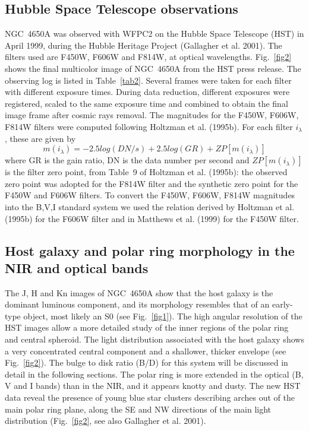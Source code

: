 \documentclass[preprint]{aastex}
\begin{document}
\subsection{Hubble Space Telescope observations}\label{HSTobs}
NGC~4650A was observed with WFPC2 on the Hubble Space Telescope (HST) 
in April 1999, during the Hubble Heritage Project 
(Gallagher et al. 2001).
The filters used are F450W, F606W and F814W, at 
optical wavelengths.
Fig.~\ref{fig2} shows the final multicolor image of NGC~4650A from the 
HST press release.
The observing log is listed in Table~\ref{tab2}.
Several frames were taken for each filter with different exposure times.
During data reduction, different exposures were registered,
scaled to the same exposure time and combined to obtain the final image frame
after cosmic rays removal. 
The magnitudes for the F450W, F606W, F814W filters were computed
following Holtzman et al. (1995b). 
For each filter $i_{\lambda}$, these are given by
\begin{equation}
m(i_{\lambda})=-2.5log(DN/s)+2.5log(GR)+ZP[m(i_{\lambda})]
\end{equation}
where GR is the gain ratio,
DN is the data number per second and $ZP[m(i_{\lambda})]$
is the filter zero point, from Table~9 of Holtzman et al. (1995b):
the observed zero point was adopted for the F814W filter and the
synthetic zero point for the F450W and F606W filters.
To convert the F450W, F606W, F814W magnitudes into the B,V,I standard system 
we used the relation derived by Holtzman et al. (1995b) for the F606W filter 
and in Matthews et al. (1999) for the F450W filter.

\subsection{Host galaxy and polar ring morphology in the NIR and optical 
bands} 
\label{morphology}

The J, H and Kn images of NGC~4650A show that the host galaxy is
the dominant luminous component, and its morphology resembles that 
of an early-type object, most likely an S0 (see Fig.~\ref{fig1}). 
The high angular resolution of the HST images allow a more detailed study of 
the inner regions of the polar ring and central spheroid. The light
distribution associated with the host galaxy shows a very concentrated
central component and a shallower, thicker envelope (see Fig.~\ref{fig2}). 
The bulge to disk ratio (B/D) for this system will be discussed in detail 
in the following sections.
The polar ring is more extended in the optical (B, V and I bands) than
in the NIR, and it appears knotty and dusty. The new HST data
reveal the presence of young blue star clusters describing arches out of
the main polar ring plane, along the SE and NW directions 
of the main light distribution (Fig.~\ref{fig2}, 
see also Gallagher et al. 2001).
\end{document}
